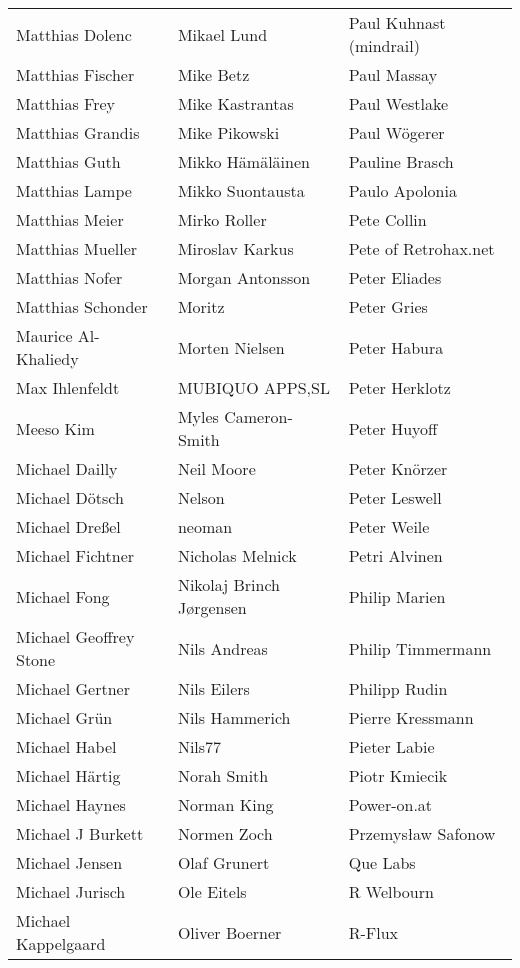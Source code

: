 \begin{small}
\begin{tabular}{p{4cm}p{4cm}p{4cm}}
Matthias Dolenc & Mikael Lund & Paul Kuhnast (mindrail) \\
Matthias Fischer & Mike Betz & Paul Massay \\
Matthias Frey & Mike Kastrantas & Paul Westlake \\
Matthias Grandis & Mike Pikowski & Paul Wögerer \\
Matthias Guth & Mikko Hämäläinen & Pauline Brasch \\
Matthias Lampe & Mikko Suontausta & Paulo Apolonia \\
Matthias Meier & Mirko Roller & Pete Collin \\
Matthias Mueller & Miroslav Karkus & Pete of Retrohax.net \\
Matthias Nofer & Morgan Antonsson & Peter Eliades \\
Matthias Schonder & Moritz & Peter Gries \\
Maurice Al-Khaliedy & Morten Nielsen & Peter Habura \\
Max Ihlenfeldt & MUBIQUO APPS,SL & Peter Herklotz \\
Meeso Kim & Myles Cameron-Smith & Peter Huyoff \\
Michael Dailly & Neil Moore & Peter Knörzer \\
Michael Dötsch & Nelson & Peter Leswell \\
Michael Dreßel & neoman & Peter Weile \\
Michael Fichtner & Nicholas Melnick & Petri Alvinen \\
Michael Fong & Nikolaj Brinch Jørgensen & Philip Marien \\
Michael Geoffrey Stone & Nils Andreas & Philip Timmermann \\
Michael Gertner & Nils Eilers & Philipp Rudin \\
Michael Grün & Nils Hammerich & Pierre Kressmann \\
Michael Habel & Nils77 & Pieter Labie \\
Michael Härtig & Norah Smith & Piotr Kmiecik \\
Michael Haynes & Norman King & Power-on.at \\
Michael J Burkett & Normen Zoch & Przemysław Safonow \\
Michael Jensen & Olaf Grunert & Que Labs \\
Michael Jurisch & Ole Eitels & R Welbourn \\
Michael Kappelgaard & Oliver Boerner & R-Flux \\

\end{tabular}
\end{small}
